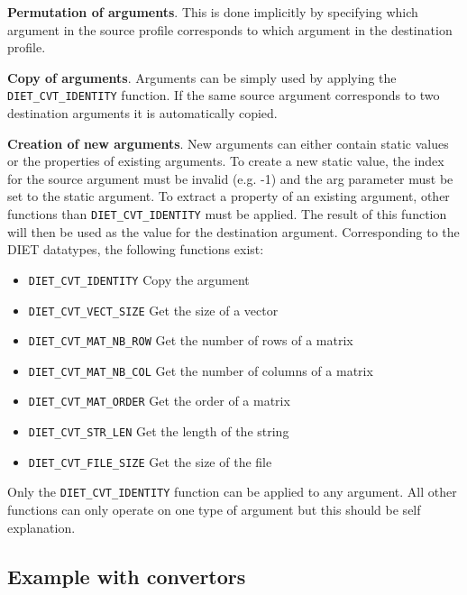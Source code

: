 \begin{description}
\item{\textbf{Permutation of arguments}}. This is done implicitly by
  specifying which argument in the source profile corresponds to which
  argument in the destination profile.
\item{\textbf{Copy of arguments}}. Arguments can be simply used by
  applying the \texttt{DIET\_CVT\_IDENTITY} function. If the same
  source argument corresponds to two destination arguments it is
  automatically copied.
\item{\textbf{Creation of new arguments}}. New arguments can either
  contain static values or the properties of existing arguments. To
  create a new static value, the index for the source argument must be
  invalid (e.g. -1) and the arg parameter must be set to the static
  argument. To extract a property of an existing argument, other
  functions than \texttt{DIET\_CVT\_IDENTITY} must be applied. The
  result of this function will then be used as the value for the
  destination argument.  Corresponding to the DIET datatypes, the
  following functions exist: \\
\begin{itemize}
\item{\texttt{DIET\_CVT\_IDENTITY}} Copy the argument
\item{\texttt{DIET\_CVT\_VECT\_SIZE}} Get the size of a vector
\item{\texttt{DIET\_CVT\_MAT\_NB\_ROW}} Get the number of rows of a matrix
\item{\texttt{DIET\_CVT\_MAT\_NB\_COL}} Get the number of columns of a matrix
\item{\texttt{DIET\_CVT\_MAT\_ORDER}} Get the order of a matrix
\item{\texttt{DIET\_CVT\_STR\_LEN}} Get the length of the string
\item{\texttt{DIET\_CVT\_FILE\_SIZE}} Get the size of the file
\end{itemize}
Only the \texttt{DIET\_CVT\_IDENTITY} function can be applied to any
argument.  All other functions can only operate on one type of
argument but this should be self explanation.

\end{description}

\subsection{Example with convertors}

